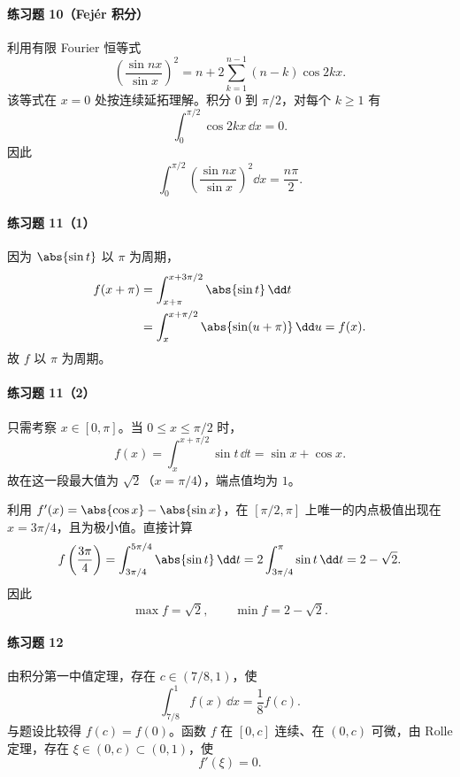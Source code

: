 \paragraph{练习题 10（Fejér 积分）}
\begin{xsolution}
利用有限 Fourier 恒等式
\[
  \left(\frac{\sin nx}{\sin x}\right)^2
  =n+2\sum_{k=1}^{n-1}(n-k)\cos2kx.
\]
该等式在 $x=0$ 处按连续延拓理解。积分 $0$ 到 $\pi/2$，对每个 $k\geqslant1$ 有
\[
  \int_0^{\pi/2}\cos2kx\,\dd x=0.
\]
因此
\[
  \boxed{\int_0^{\pi/2}\left(\frac{\sin nx}{\sin x}\right)^2\dd x
  =\frac{n\pi}{2}}.
\]
\end{xsolution}

\paragraph{练习题 11（1）}
\begin{xsolution}
因为 $\abs{\sin t}$ 以 $\pi$ 为周期，
\begin{align*}
  f(x+\pi)
  &=\int_{x+\pi}^{x+3\pi/2}\abs{\sin t}\,\dd t\\
  &=\int_x^{x+\pi/2}\abs{\sin(u+\pi)}\,\dd u
  =f(x).
\end{align*}
故 $f$ 以 $\pi$ 为周期。
\end{xsolution}

\paragraph{练习题 11（2）}
\begin{xsolution}
只需考察 $x\in[0,\pi]$。当 $0\leqslant x\leqslant\pi/2$ 时，
\[
  f(x)=\int_x^{x+\pi/2}\sin t\,\dd t
  =\sin x+\cos x.
\]
故在这一段最大值为 $\sqrt2$（$x=\pi/4$），端点值均为 $1$。

利用 $f'(x)=\abs{\cos x}-\abs{\sin x}$，在 $[\pi/2,\pi]$ 上唯一的内点极值出现在 $x=3\pi/4$，且为极小值。直接计算
\[
  f\left(\frac{3\pi}4\right)
  =\int_{3\pi/4}^{5\pi/4}\abs{\sin t}\,\dd t
  =2\int_{3\pi/4}^{\pi}\sin t\,\dd t
  =2-\sqrt2.
\]
因此
\[
  \boxed{\max f=\sqrt2,\qquad \min f=2-\sqrt2}.
\]
\end{xsolution}

\paragraph{练习题 12}
\begin{xsolution}
由积分第一中值定理，存在 $c\in(7/8,1)$，使
\[
  \int_{7/8}^1f(x)\,\dd x=\frac18f(c).
\]
与题设比较得 $f(c)=f(0)$。函数 $f$ 在 $[0,c]$ 连续、在 $(0,c)$ 可微，由 Rolle 定理，存在 $\xi\in(0,c)\subset(0,1)$，使
\[
  \boxed{f'(\xi)=0}.
\]
\end{xsolution}


